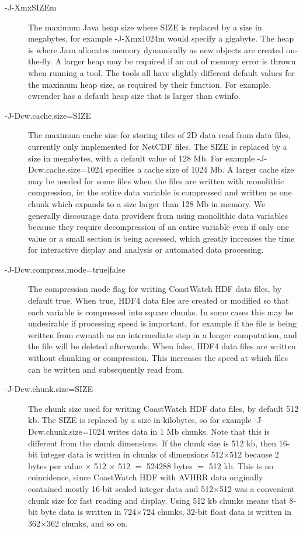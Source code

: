 \begin{description}

  \item[{\file -J-XmxSIZEm}] The maximum Java heap size where SIZE is replaced
  by a size in megabytes, for example {\file -J-Xmx1024m} would specify a
  gigabyte.  The heap is where Java allocates memory dynamically as new objects
  are created on-the-fly.  A larger heap may be required if an out of memory
  error is thrown when running a tool.  The tools all have slightly different
  default values for the maximum heap size, as required by their function.
  For example, cwrender has a default heap size that is larger than cwinfo.

  \item[{\file -J-Dcw.cache.size=SIZE}] The maximum cache size for storing
  tiles of 2D data read from data files, currently only implemented for NetCDF
  files.  The SIZE is replaced by a size in megabytes, with a default value
  of 128 Mb.  For example {\file -J-Dcw.cache.size=1024} specifies a cache
  size of 1024 Mb.  A larger cache size may be needed for some files when the
  files are written with monolithic compression, ie: the entire data variable
  is compressed and written as one chunk which expands to a size larger than
  128 Mb in memory.  We generally discourage data providers from using monolithic data
  variables because they require decompression of an entire variable even if
  only one value or a small section is being accessed, which greatly increases
  the time for interactive display and analysis or automated data processing.

  \item[{\file -J-Dcw.compress.mode=true$|$false}] The compression mode flag for
  writing CoastWatch HDF data files, by default true.  When true, HDF4 data
  files are created or modified so that each variable is compressed into
  square chunks.  In some cases this may be undesirable if processing speed
  is important, for example if the file is being written from cwmath
  as an intermediate step in a longer computation, and the file will be
  deleted afterwards.  When false, HDF4 data files are written without
  chunking or compression.  This increases the speed at which files can be
  written and subsequently read from.

  \item[{\file -J-Dcw.chunk.size=SIZE}] The chunk size used for writing
  CoastWatch HDF data files, by default 512 kb.  The SIZE is replaced by
  a size in kilobytes, so for example {\file -J-Dcw.chunk.size=1024} writes
  data in 1 Mb chunks.  Note that this is different from the chunk dimensions.
  If the chunk size is 512 kb, then 16-bit integer data is written in
  chunks of dimensions 512$\times$512 because 2 bytes per value $\times$ 512
  $\times$ 512 $=$ 524288 bytes $=$ 512 kb.  This is no coincidence, since
  CoastWatch HDF with AVHRR data originally contained mostly 16-bit scaled
  integer data and 512$\times$512 was a convenient chunk size for fast
  reading and display.  Using 512 kb chunks means that 8-bit byte data is written
  in 724$\times$724 chunks, 32-bit float data is written in 362$\times$362
  chunks, and so on.

\end{description}
